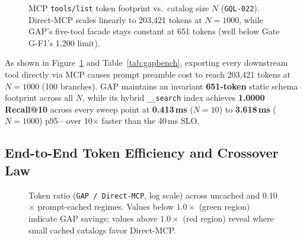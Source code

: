 \documentclass[10pt,twocolumn]{article}
\begin{document}
\begin{figure}[t]
  \centering
  
  \caption{MCP \texttt{tools/list} token footprint vs.\ catalog size $N$ (\texttt{GQL-022}). Direct-MCP scales linearly to 203,421 tokens at $N=1000$, while GAP's five-tool facade stays constant at 651 tokens (well below Gate G-F1's 1,200 limit).}
  \label{fig:scaling}
\end{figure}

As shown in Figure~\ref{fig:scaling} and Table~\ref{tab:gapbench}, exporting every downstream tool directly via MCP causes prompt preamble cost to reach 203,421 tokens at $N=1000$ (100 branches). GAP maintains an invariant \textbf{651-token} static schema footprint across all $N$, while its hybrid \texttt{\_\_search} index achieves \textbf{1.0000 Recall@10} across every sweep point at \textbf{0.413\,ms} ($N=10$) to \textbf{3.618\,ms} ($N=1000$) p95—over 10$\times$ faster than the 40\,ms SLO.

\subsection{End-to-End Token Efficiency and Crossover Law}

\begin{figure}[t]
  \centering
  
  \caption{Token ratio (\texttt{GAP / Direct-MCP}, log scale) across uncached and 0.10$\times$ prompt-cached regimes. Values below $1.0\times$ (green region) indicate GAP savings; values above $1.0\times$ (red region) reveal where small cached catalogs favor Direct-MCP.}
  \label{fig:crossover}
\end{figure}
\end{document}
